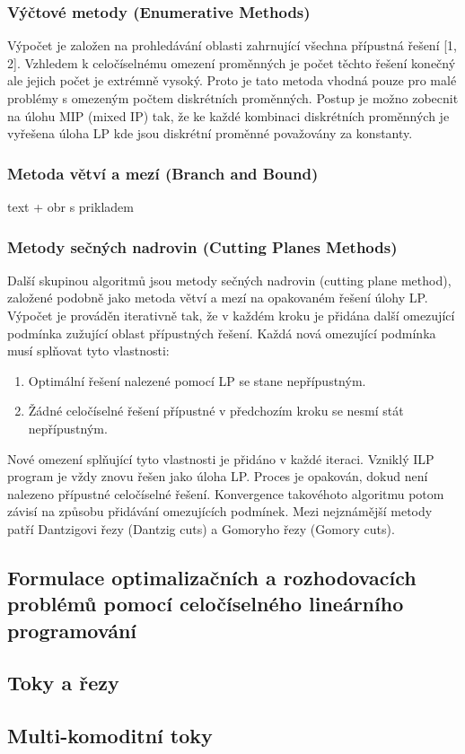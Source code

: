 \subsubsection*{Výčtové metody (Enumerative Methods)}
Výpočet je založen na prohledávání oblasti zahrnující všechna přípustná řešení [1, 2]. Vzhledem k celočíselnému omezení proměnných je počet těchto řešení konečný ale jejich počet je extrémně vysoký. Proto je tato metoda vhodná pouze pro malé problémy s omezeným počtem diskrétních proměnných. Postup je možno zobecnit na úlohu MIP (mixed IP) tak, že ke každé kombinaci diskrétních proměnných je vyřešena úloha LP kde jsou diskrétní proměnné považovány za konstanty. \cite{ko:ilp-sucha}

\subsubsection*{Metoda větví a mezí (Branch and Bound)}
text + obr s prikladem

\subsubsection*{Metody sečných nadrovin (Cutting Planes Methods)}
Další skupinou algoritmů jsou metody sečných nadrovin (cutting plane method), založené podobně jako metoda větví a mezí na opakovaném řešení úlohy LP. Výpočet je prováděn iterativně tak, že v každém kroku je přidána další omezující podmínka zužující oblast přípustných řešení. Každá nová omezující podmínka musí splňovat tyto vlastnosti:

\begin{enumerate}
	\item Optimální řešení nalezené pomocí LP se stane nepřípustným.
	\item Žádné celočíselné řešení přípustné v předchozím kroku se nesmí stát nepřípustným. 
\end{enumerate}

Nové omezení splňující tyto vlastnosti je přidáno v každé iteraci. Vzniklý ILP program je vždy znovu řešen jako úloha LP. Proces je opakován, dokud není nalezeno přípustné celočíselné řešení. Konvergence takovéhoto algoritmu potom závisí na způsobu přidávání omezujících podmínek. Mezi nejznámější metody patří Dantzigovi řezy (Dantzig cuts) a Gomoryho řezy (Gomory cuts). \cite{ko:ilp-sucha}

\subsection*{Formulace optimalizačních a rozhodovacích problémů pomocí celočíselného lineárního programování}

\subsection*{Toky a řezy}

\subsection*{Multi-komoditní toky}